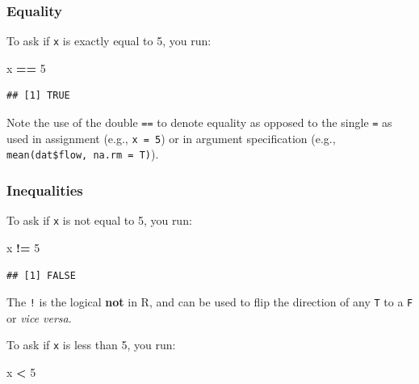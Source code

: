 \documentclass[]{book}
\newenvironment{Shaded}{\begin{snugshade}}{\end{snugshade}}
\newcommand{\DecValTok}[1]{\textcolor[rgb]{0.00,0.00,0.81}{#1}}
\newcommand{\NormalTok}[1]{#1}
\newcommand{\OperatorTok}[1]{\textcolor[rgb]{0.81,0.36,0.00}{\textbf{#1}}}
\newcommand{\StringTok}[1]{\textcolor[rgb]{0.31,0.60,0.02}{#1}}
\begin{document}
\hypertarget{equality}{%
\subsubsection*{Equality}\label{equality}}

To ask if \texttt{x} is exactly equal to 5, you run:

\begin{Shaded}
\begin{Highlighting}[]
\NormalTok{x }\OperatorTok{==}\StringTok{ }\DecValTok{5}
\end{Highlighting}
\end{Shaded}

\begin{verbatim}
## [1] TRUE
\end{verbatim}

Note the use of the double \texttt{==} to denote equality as opposed to the single \texttt{=} as used in assignment (e.g., \texttt{x\ =\ 5}) or in argument specification (e.g., \texttt{mean(dat\$flow,\ na.rm\ =\ T)}).

\hypertarget{inequalities}{%
\subsubsection*{Inequalities}\label{inequalities}}

To ask if \texttt{x} is not equal to 5, you run:

\begin{Shaded}
\begin{Highlighting}[]
\NormalTok{x }\OperatorTok{!=}\StringTok{ }\DecValTok{5}
\end{Highlighting}
\end{Shaded}

\begin{verbatim}
## [1] FALSE
\end{verbatim}

The \texttt{!} is the logical \textbf{not} in R, and can be used to flip the direction of any \texttt{T} to a \texttt{F} or \emph{vice versa}.

To ask if \texttt{x} is less than 5, you run:

\begin{Shaded}
\begin{Highlighting}[]
\NormalTok{x }\OperatorTok{<}\StringTok{ }\DecValTok{5}
\end{Highlighting}
\end{Shaded}
\end{document}
